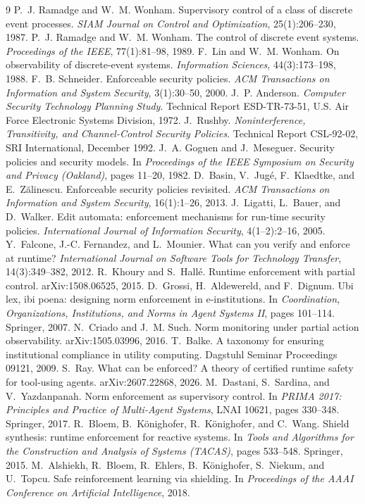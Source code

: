 \documentclass[11pt,a4paper]{article}  \usepackage{mdframed} \usepackage{graphicx} \usepackage{tabularx}
\begin{document}
\begin{thebibliography}{9}  P.~J. Ramadge and W.~M. Wonham. Supervisory control of a class of discrete event
processes. \emph{SIAM Journal on Control and Optimization}, 25(1):206--230, 1987.  P.~J. Ramadge and W.~M.
Wonham. The control of discrete event systems. \emph{Proceedings of the IEEE}, 77(1):81--98, 1989.  F.~Lin and
W.~M. Wonham. On observability of discrete-event systems. \emph{Information Sciences}, 44(3):173--198, 1988.
 F.~B. Schneider. Enforceable security policies. \emph{ACM Transactions on Information and System
Security}, 3(1):30--50, 2000.  J.~P. Anderson. \emph{Computer Security Technology Planning Study}.
Technical Report ESD-TR-73-51, U.S. Air Force Electronic Systems Division, 1972.  J.~Rushby.
\emph{Noninterference, Transitivity, and Channel-Control Security Policies}. Technical Report CSL-92-02, SRI International,
December 1992.  J.~A. Goguen and J.~Meseguer. Security policies and security models. In \emph{Proceedings of
the IEEE Symposium on Security and Privacy (Oakland)}, pages 11--20, 1982.
 D.~Basin, V.~Jug\'e, F.~Klaedtke, and E.~Z\u{a}linescu. Enforceable security policies revisited.
\emph{ACM Transactions on Information and System Security}, 16(1):1--26, 2013.
 J.~Ligatti, L.~Bauer, and D.~Walker. Edit automata: enforcement mechanisms for run-time security policies.
\emph{International Journal of Information Security}, 4(1--2):2--16, 2005.
 Y.~Falcone, J.-C. Fernandez, and L.~Mounier. What can you verify and enforce at runtime?
\emph{International Journal on Software Tools for Technology Transfer}, 14(3):349--382, 2012.
 R.~Khoury and S.~Hall\'e. Runtime enforcement with partial control. arXiv:1508.06525, 2015.
 D.~Grossi, H.~Aldewereld, and F.~Dignum. Ubi lex, ibi poena: designing norm enforcement in e-institutions.
In \emph{Coordination, Organizations, Institutions, and Norms in Agent Systems II}, pages 101--114. Springer, 2007.
 N.~Criado and J.~M. Such. Norm monitoring under partial action observability. arXiv:1505.03996, 2016.
 T.~Balke. A taxonomy for ensuring institutional compliance in utility computing. Dagstuhl Seminar
Proceedings 09121, 2009.
 S.~Ray. What can be enforced? A theory of certified runtime safety for tool-using agents.
arXiv:2607.22868, 2026.
 M.~Dastani, S.~Sardina, and V.~Yazdanpanah. Norm enforcement as supervisory control. In \emph{PRIMA 2017:
Principles and Practice of Multi-Agent Systems}, LNAI 10621, pages 330--348. Springer, 2017.
 R.~Bloem, B.~K\"onighofer, R.~K\"onighofer, and C.~Wang. Shield synthesis: runtime enforcement for reactive
systems. In \emph{Tools and Algorithms for the Construction and Analysis of Systems (TACAS)}, pages 533--548. Springer, 2015.
 M.~Alshiekh, R.~Bloem, R.~Ehlers, B.~K\"onighofer, S.~Niekum, and U.~Topcu. Safe reinforcement learning
via shielding. In \emph{Proceedings of the AAAI Conference on Artificial Intelligence}, 2018. \end{thebibliography}
\end{document}
